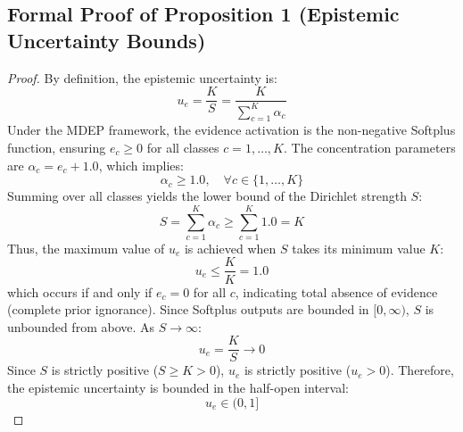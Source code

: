 \documentclass[letterpaper]{article} %
\begin{document}
\subsection{Formal Proof of Proposition 1 (Epistemic Uncertainty Bounds)}
\begin{proof}
By definition, the epistemic uncertainty is:
\begin{equation}
    u_e = \frac{K}{S} = \frac{K}{\sum_{c=1}^K \alpha_c}
\end{equation}
Under the MDEP framework, the evidence activation is the non-negative Softplus function, ensuring $e_c \ge 0$ for all classes $c = 1, \dots, K$. The concentration parameters are $\alpha_c = e_c + 1.0$, which implies:
\begin{equation}
    \alpha_c \ge 1.0, \quad \forall c \in \{1, \dots, K\}
\end{equation}
Summing over all classes yields the lower bound of the Dirichlet strength $S$:
\begin{equation}
    S = \sum_{c=1}^K \alpha_c \ge \sum_{c=1}^K 1.0 = K
\end{equation}
Thus, the maximum value of $u_e$ is achieved when $S$ takes its minimum value $K$:
\begin{equation}
    u_e \le \frac{K}{K} = 1.0
\end{equation}
which occurs if and only if $e_c = 0$ for all $c$, indicating total absence of evidence (complete prior ignorance). Since Softplus outputs are bounded in $[0, \infty)$, $S$ is unbounded from above. As $S \to \infty$:
\begin{equation}
    u_e = \frac{K}{S} \to 0
\end{equation}
Since $S$ is strictly positive ($S \ge K > 0$), $u_e$ is strictly positive ($u_e > 0$). Therefore, the epistemic uncertainty is bounded in the half-open interval:
\begin{equation}
    u_e \in (0, 1]
\end{equation}
\end{proof}
\end{document}
